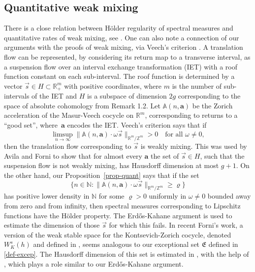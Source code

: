 \documentclass[11pt]{article}
\numberwithin{equation}{section}\newcommand{\Relation}[2][]{}\newtheorem*{prop*}{Proposition}
\newcommand{\sep}{:}
\theoremstyle{plain}
\theoremstyle{definition}
\newcommand\bom{{\boldsymbol a}}\let\ba\bom
\let\om\omega
\newcommand\Fre{\mathfrak{E}}
\newcommand\Aa{\mathbb{A}}
\newcommand{\R}{\mathbb{R}}
\newcommand{\Z}{\mathbb{Z}}
\newcommand{\N}{\mathbb{N}}
\begin{document}
\subsection{Quantitative weak mixing} There is a close relation between Hölder regularity of spectral measures and quantitative rates of weak mixing, see \cite{BuSo18b,Forni2}. One can also note a connection of our arguments with the proofs of weak mixing, via Veech's criterion \cite{veechamj}. A translation flow can be represented, by considering its return map to a transverse interval, as a suspension flow over an interval exchange transformation (IET) with a roof function constant on each sub-interval. The roof function is determined by a vector $\vec s\in H\subset \R^m_+$ with positive coordinates, where $m$ is the number of sub-intervals of the IET and $H$ is a subspace of dimension $2g$ corresponding to the space of absolute cohomology from Remark 1.2. Let $\Aa(n,\bom)$ be the Zorich acceleration of the Masur-Veech cocycle on $\R^m$, corresponding to returns to a ``good set'', where~$\bom$ encodes the IET. Veech's criterion \cite[\S 7]{veechamj} says that if\vspace*{-3pt}
\[
\limsup_{n\to \infty} \|\Aa(n,\bom)\cdot \om \vec{s}\|_{\R^m/\Z^m}>0\quad \text{for all }\om\ne 0,
\]
then the translation flow corresponding to $\vec s$ is weakly mixing. This was used by Avila and Forni \cite[Th.\,A.2]{AF} to show that for almost every $\bom$ the set of $\vec s\in H$, such that the suspension flow is not weakly mixing, has Hausdorff dimension at most $g+1$. On the other hand, our Proposition~\ref{prop-quant} says that if the set\vspace*{-3pt}
\[
\{n\in \N\sep \|\Aa(n,\bom)\cdot \om \vec{s}\|_{\R^m/\Z^m} \ge \varrho\}
\]
has positive lower density in $\N$ for some $\varrho>0$ uniformly in $\om\ne 0$ bounded away from zero and from infinity, then spectral measures corresponding to Lipschitz functions have the Hölder property. The Erd\H{o}s-Kahane argument is used to estimate the dimension of those $\vec s$ for which this fails.
In recent Forni's work, a version of the weak stable space for the Kontsevich-Zorich cocycle, denoted $W_K^s(h)$ and defined in \cite[\S6]{Forni2}, seems analogous to our exceptional set $\Fre$ defined in \eqref{def-excep}. The Hausdorff dimension of this set is estimated in \cite[Th.\,6.3]{Forni2}, with the help of \cite[Lem.\,6.2]{Forni2}, which plays a role similar to our Erd\H{o}s-Kahane argument.
\end{document}
